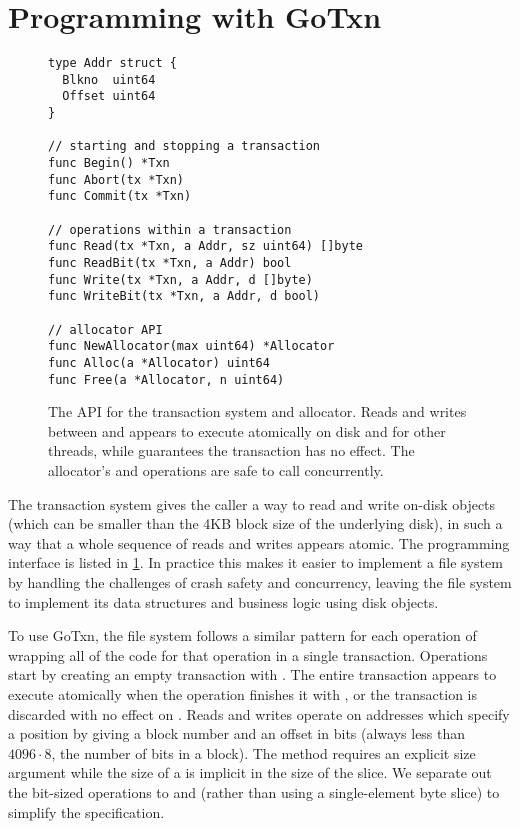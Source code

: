 \section{Programming with GoTxn}
\label{s:gotxn-api}

\begin{figure}
\begin{verbatim}
type Addr struct {
  Blkno  uint64
  Offset uint64
}

// starting and stopping a transaction
func Begin() *Txn
func Abort(tx *Txn)
func Commit(tx *Txn)

// operations within a transaction
func Read(tx *Txn, a Addr, sz uint64) []byte
func ReadBit(tx *Txn, a Addr) bool
func Write(tx *Txn, a Addr, d []byte)
func WriteBit(tx *Txn, a Addr, d bool)

// allocator API
func NewAllocator(max uint64) *Allocator
func Alloc(a *Allocator) uint64
func Free(a *Allocator, n uint64)
\end{verbatim}
  \caption{The API for the transaction system and allocator. Reads and writes
    between  and  appears to execute atomically on disk and
    for other threads, while  guarantees the transaction has no
    effect. The allocator's  and  operations are safe to call
    concurrently.}
\label{fig:txn-api}
\end{figure}

The transaction system gives the caller a way to read and write on-disk
objects (which can be smaller than the 4KB block size of the underlying disk),
in such a way that a whole sequence of reads and writes appears atomic. The
programming interface is listed in \cref{fig:txn-api}. In practice this makes
it easier to implement a file system by handling the challenges of crash safety
and concurrency, leaving the file system to implement its data structures and
business logic using disk objects.

To use GoTxn, the file system follows a similar pattern for each operation of
wrapping all of the code for that operation in a single transaction. Operations
start by creating an empty transaction with .
The entire
transaction appears to execute atomically when the operation finishes it
with , or the transaction is discarded with no effect on
. Reads and writes operate on addresses which specify a
position by giving a block number and an offset in bits (always less
than $4096 \cdot 8$, the number of bits in a block). The 
method requires an explicit size argument while the size of a
 is implicit in the size of the  slice. We separate
out the bit-sized operations to  and  (rather
than using a single-element byte slice) to simplify the specification.

